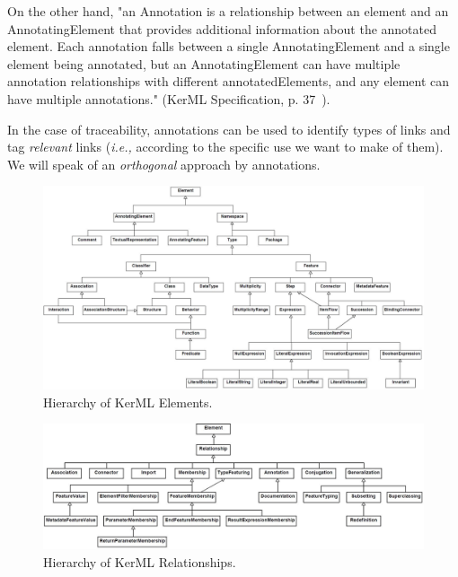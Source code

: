 On the other hand, "an Annotation is a relationship between an element and an AnnotatingElement that provides additional information about the annotated element. Each annotation falls between a single AnnotatingElement and a single element being annotated, but an AnnotatingElement can have multiple annotation relationships with different annotatedElements, and any element can have multiple annotations." (KerML Specification, p. 37~\cite{kerML}).

In the case of traceability, annotations can be used to identify types of links and tag \textit{relevant} links (\textit{i.e.,} according to the specific use we want to make of them). We will speak of an \textit{orthogonal} approach by annotations. 
\vspace{5em}
\begin{figure}[ht]     
	\centering
	\includegraphics[width=.99\linewidth]{images/kerml-element.png}
	\caption{Hierarchy of KerML Elements.}
	\label{fig:eltshierarchy}
\end{figure}

\begin{figure}[ht]     
	\centering
	\includegraphics[width=.99\linewidth]{images/kerml-relationship.jpg}
	\caption{Hierarchy of KerML Relationships.}
	\label{fig:relhierarchy}
\end{figure}




